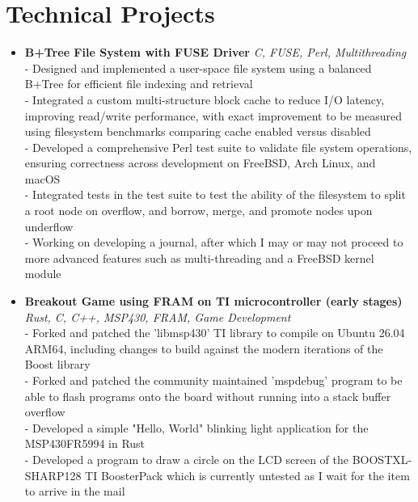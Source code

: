 \documentclass[11pt]{article}
\begin{document}
\section*{Technical Projects}
\vspace{-0.1in}
\begin{itemize}[leftmargin=*]
    \item \textbf{B+Tree File System with FUSE Driver} \hfill \textit{C, FUSE, Perl, Multithreading} \\
    - Designed and implemented a user-space file system using a balanced B+Tree for efficient file indexing and retrieval \\
    - Integrated a custom multi-structure block cache to reduce I/O latency, improving read/write performance, with exact improvement to be measured using filesystem benchmarks comparing cache enabled versus disabled \\
    - Developed a comprehensive Perl test suite to validate file system operations, ensuring correctness across development on FreeBSD, Arch Linux, and macOS \\
    - Integrated tests in the test suite to test the ability of the filesystem to split a root node on overflow, and borrow, merge, and promote nodes upon underflow \\
    - Working on developing a journal, after which I may or may not proceed to more advanced features such as multi-threading and a FreeBSD kernel module
    \item \textbf{Breakout Game using FRAM on TI microcontroller (early stages)} \hfill \textit{Rust, C, C++, MSP430, FRAM, Game Development} \\
    - Forked and patched the 'libmsp430' TI library to compile on Ubuntu 26.04 ARM64, including changes to build against the modern iterations of the Boost library \\
    - Forked and patched the community maintained 'mspdebug' program to be able to flash programs onto the board without running into a stack buffer overflow \\
    - Developed a simple "Hello, World" blinking light application for the MSP430FR5994 in Rust \\
    - Developed a program to draw a circle on the LCD screen of the BOOSTXL-SHARP128 TI BoosterPack which is currently untested as I wait for the item to arrive in the mail
\end{itemize}
\end{document}
